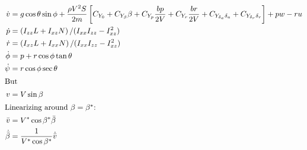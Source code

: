 \documentclass{article}
\begin{document}
\begin{align*}
  \dot{v} &= g \cos \theta \sin \phi + \frac{\rho V^2 S}{2m}\left [ C_{Y_0} + C_{Y_\beta}\beta
    + C_{Y_p}\frac{bp}{2V} + C_{Y_r}\frac{br}{2V} + C_{Y_{\delta_a}\delta_a} + C_{Y_{\delta_r}\delta_r} \right ] +pw - ru \\
  \dot{p} &= \left (I_{zz}L + I_{xz}N \right ) / (I_{xx} I_{zz} - I^2_{xz}) \\
  \dot{r} &= \left (I_{xz}L + I_{xx}N \right ) / (I_{xx} I_{zz} - I^2_{xz}) \\
  \dot{\phi} &= p + r \cos \phi \tan \theta \\
  \dot{\psi} &= r \cos \phi \sec \theta \\
\intertext{But}
v &= V \sin \beta \\
\intertext{Linearizing around $\beta = \beta^*$:} 
\bar{v} &= V^* \cos \beta^* \bar{\beta} \\
\dot{\bar{\beta}} &= \frac{1}{V^* \cos \beta^*} \dot{\bar{v}} 
\end{align*}
\end{document}
